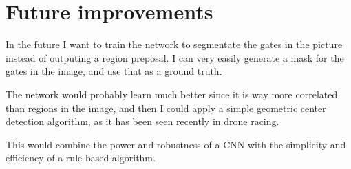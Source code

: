\chapter{Future improvements}

In the future I want to train the network to segmentate the gates in the
picture instead of outputing a region preposal. I can very easily generate a
mask for the gates in the image, and use that as a ground truth.

The network would probably learn much better since it is way more correlated
than regions in the image, and then I could apply a simple geometric center
detection algorithm, as it has been seen recently in drone racing.


This would combine the power and robustness of a CNN with the simplicity and
efficiency of a rule-based algorithm.
